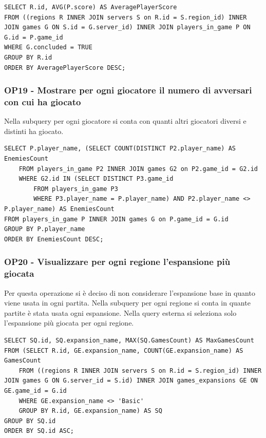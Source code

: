 \begin{lstlisting}[style=sql]
SELECT R.id, AVG(P.score) AS AveragePlayerScore
FROM ((regions R INNER JOIN servers S on R.id = S.region_id) INNER JOIN games G ON S.id = G.server_id) INNER JOIN players_in_game P ON G.id = P.game_id
WHERE G.concluded = TRUE
GROUP BY R.id
ORDER BY AveragePlayerScore DESC;
\end{lstlisting}

\subsubsection*{OP19 - Mostrare per ogni giocatore il numero di avversari con cui ha giocato}
Nella subquery per ogni giocatore si conta con quanti altri giocatori diversi e distinti ha giocato.
\medskip

\begin{lstlisting}[style=sql]
SELECT P.player_name, (SELECT COUNT(DISTINCT P2.player_name) AS EnemiesCount
    FROM players_in_game P2 INNER JOIN games G2 on P2.game_id = G2.id
    WHERE G2.id IN (SELECT DISTINCT P3.game_id
        FROM players_in_game P3
        WHERE P3.player_name = P.player_name) AND P2.player_name <> P.player_name) AS EnemiesCount
FROM players_in_game P INNER JOIN games G on P.game_id = G.id
GROUP BY P.player_name
ORDER BY EnemiesCount DESC;
\end{lstlisting}

\subsubsection*{OP20 - Visualizzare per ogni regione l'espansione più giocata}
Per questa operazione si è deciso di non considerare l'espansione base in quanto viene usata in ogni partita. Nella subquery per ogni regione si conta in quante partite è stata usata ogni espansione. Nella query esterna si seleziona solo l'espansione più giocata per ogni regione.
\medskip

\begin{lstlisting}[style=sql]
SELECT SQ.id, SQ.expansion_name, MAX(SQ.GamesCount) AS MaxGamesCount
FROM (SELECT R.id, GE.expansion_name, COUNT(GE.expansion_name) AS GamesCount
    FROM ((regions R INNER JOIN servers S on R.id = S.region_id) INNER JOIN games G ON G.server_id = S.id) INNER JOIN games_expansions GE ON GE.game_id = G.id
    WHERE GE.expansion_name <> 'Basic'
    GROUP BY R.id, GE.expansion_name) AS SQ
GROUP BY SQ.id
ORDER BY SQ.id ASC;
\end{lstlisting}

